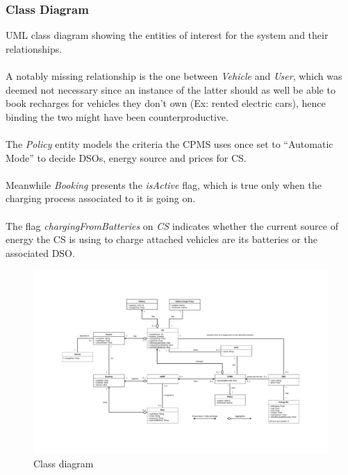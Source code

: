 \documentclass[11pt]{article}
\begin{document}
\subsubsection{Class Diagram}
\label{subsection:classDiagram}

UML class diagram showing the entities of interest for the system and their relationships. \\
\\
A notably missing relationship is the one between \textit{Vehicle} and \textit{User}, which was deemed not necessary since an instance of the latter should as well be able to book recharges for vehicles they don't own (Ex: rented electric cars), hence binding the two might have been counterproductive. \\
\\
The \textit{Policy} entity models the criteria the CPMS uses once set to “Automatic Mode” to decide DSOs, energy source and prices for CS. \\
\\
Meanwhile \textit{Booking} presents the \textit{isActive} flag, which is true only when the charging process associated to it is going on. \\
\\
The flag \textit{chargingFromBatteries} on \textit{CS} indicates whether the current source of energy the CS is using to charge attached vehicles are its batteries or the associated DSO.

\newpage

\begin{figure}[!ht]
    \centerline{
        \includegraphics[page={1}, width=1.26\linewidth, trim=4.6cm 4.9cm 4.6cm 4.9cm, angle=-90, clip]{UML.pdf}
    }
    \caption{Class diagram}
\end{figure}
\end{document}
